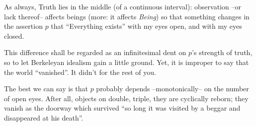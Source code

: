 As always, Truth lies in the middle (of a continuous interval): observation --or lack thereof-- affects beings (more: it affects \emph{Being}) so that something changes in the assertion $p$ that ``Everything exists'' with my eyes open, and with my eyes closed.

This difference shall be regarded as an infinitesimal dent on $p$'s strength of truth, so to let Berkeleyan idealism gain a little ground. Yet, it is improper to say that the world ``vanished''. It didn't for the rest of you.

The best we can say is that $p$ probably depends --monotonically-- on the number of open eyes. After all, objects on \tlon double, triple, they are cyclically reborn; they vanish as the doorway which survived ``so long it was visited by a beggar and disappeared at his death''.